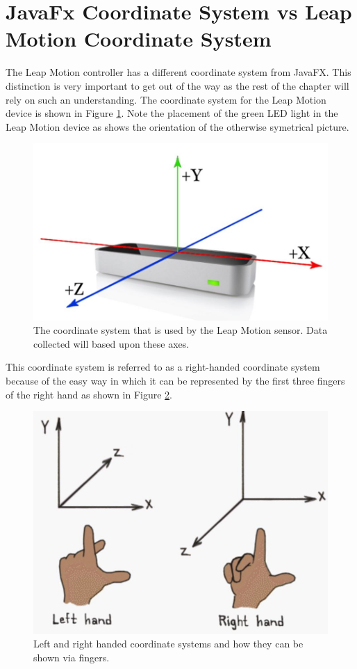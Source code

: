 \section{JavaFx Coordinate System vs Leap Motion Coordinate System}
The Leap Motion controller has a different coordinate system from JavaFX. This distinction is very important to get out of the way as the rest of the chapter will rely on such an understanding. The coordinate system for the Leap Motion device is shown in Figure \ref{fig:leapcs}. Note the placement of the green LED light in the Leap Motion device as shows the orientation of the otherwise symetrical picture.
\begin{figure}[H]
\centering
\includegraphics[scale=0.35]{Figures/4_leapCS.JPG}
\caption[Leap Motion Coordinate System]{The coordinate system that is used by the Leap Motion sensor. Data collected will based upon these axes.}
\label{fig:leapcs}
\end{figure}

This coordinate system is referred to as a right-handed coordinate system because of the easy way in which it can be represented by the first three fingers of the right hand as shown in Figure \ref{fig:lhcsRhcs}. 
\begin{figure}[H]
\centering
\includegraphics[scale=0.35]{Figures/4_lhrhCS.JPG}
\caption[Left vs Right Hand Coordinate System]{Left and right handed coordinate systems and how they can be shown via fingers.}
\label{fig:lhcsRhcs}
\end{figure}

